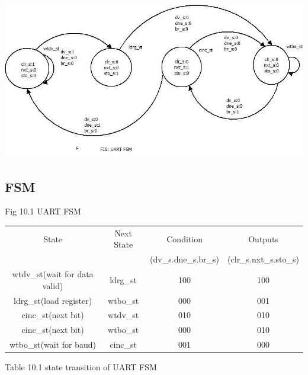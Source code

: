 \documentclass{article}
\begin{document}
\begin{center}

\includegraphics[width=17cm]{UART FSM.jpeg} 
\end{center}
\subsection{FSM}
Fig 10.1 UART FSM
\vspace{0.5cm}
  \begin{center}
  \begin{tabular}{|c|c|c|c|}
         \hline
          State & Next State & Condition & Outputs \\
        &&(dv\_s.dne\_s.br\_s)&(clr\_s.nxt\_s.sto\_s)\\
        \hline
        \hline
        wtdv\_st(wait for data valid) & ldrg\_st & 100 & 100\\ 
        \hline
        ldrg\_st(load register) & wtbo\_st & 000 & 001 \\
        \hline 
      
        cinc\_st(next bit) & wtdv\_st &  010  & 010  \\
        \hline
         cinc\_st(next bit) & wtbo\_st &     000   & 010  \\
        \hline
        wtbo\_st(wait for baud) & cinc\_st &   001 & 000\\
        \hline
          \end{tabular}
          \end{center}
          Table 10.1 state transition of UART FSM
          
\newpage
\end{document}
